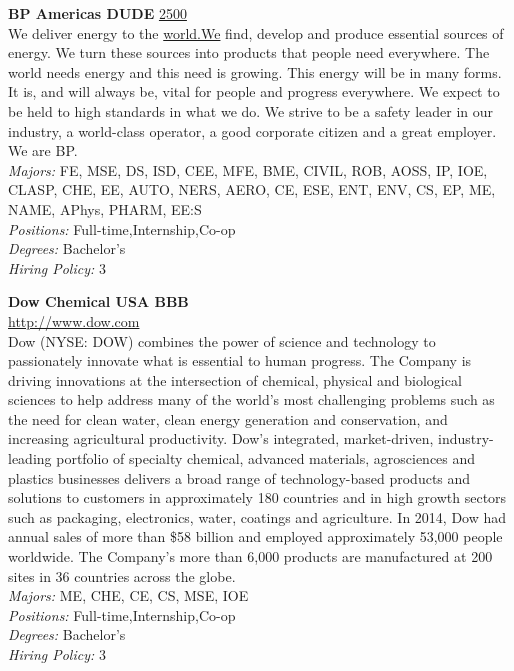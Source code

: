 \documentclass[twoside]{article}
\begin{document}
\begin{center}
\begin{multicols}{2}
\begin{minipage}{.95\columnwidth}{\Large\bf BP Americas \hfill DUDE}
    \url{2500}\\
    We deliver energy to the \url{world.We} find, develop and produce essential sources of energy. We turn these sources into products that people need everywhere. The world needs energy and this need is growing. This energy will be in many forms. It is, and will always be, vital for people and progress everywhere. We expect to be held to high standards in what we do. We strive to be a safety leader in our industry, a world-class operator, a good corporate citizen and a great employer. We are BP.\\
    \emph{Majors:} FE, MSE, DS, ISD, CEE, MFE, BME, CIVIL, ROB, AOSS, IP, IOE, CLASP, CHE, EE, AUTO, NERS, AERO, CE, ESE, ENT, ENV, CS, EP, ME, NAME, APhys, PHARM, EE:S\\
    \emph{Positions:} Full-time,Internship,Co-op\\
    \emph{Degrees:} Bachelor's\\
    \emph{Hiring Policy:} 3\\
\end{minipage}
 \begin{minipage}{.95\columnwidth}{\Large\bf Dow Chemical USA \hfill BBB}\\
    \url{http://www.dow.com}\\
    Dow (NYSE: DOW) combines the power of science and technology to passionately innovate what is essential to human progress. The Company is driving innovations at the intersection of chemical, physical and biological sciences to help address many of the world's most challenging problems such as the need for clean water, clean energy generation and conservation, and increasing agricultural productivity. Dow's integrated, market-driven, industry-leading portfolio of specialty chemical, advanced materials, agrosciences and plastics businesses delivers a broad range of technology-based products and solutions to customers in approximately 180 countries and in high growth sectors such as packaging, electronics, water, coatings and agriculture. In 2014, Dow had annual sales of more than \$58 billion and employed approximately 53,000 people worldwide. The Company's more than 6,000 products are manufactured at 200 sites in 36 countries across the globe.\\
    \emph{Majors:} ME, CHE, CE, CS, MSE, IOE\\
    \emph{Positions:} Full-time,Internship,Co-op\\
    \emph{Degrees:} Bachelor's\\
    \emph{Hiring Policy:} 3\\

\end{minipage}
\end{multicols}
\end{center}
\end{document}
